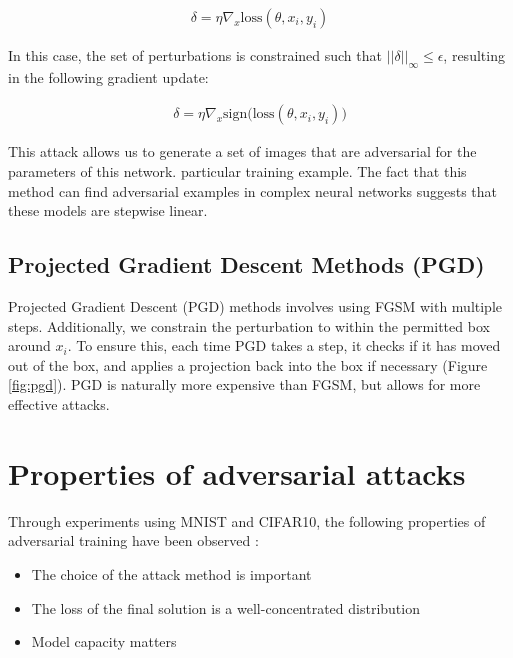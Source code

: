 \documentclass[10pt]{article}
\begin{document}
\begin{align*}
\delta = \eta \nabla_x \text{loss}(\theta, x_i, y_i)
\end{align*}

In this case, the set of perturbations is constrained such that $||\delta||_\infty\leq\epsilon$, resulting in the following gradient update:

\begin{align*}
\delta = \eta \nabla_x \text{sign}\Big(\text{loss}(\theta, x_i, y_i)\Big)
\end{align*}

This attack allows us to generate a set of images that are adversarial for the parameters of this network. particular training example. The fact that this method can find adversarial examples in complex neural networks suggests that these models are stepwise linear.

\subsection{Projected Gradient Descent Methods (PGD)}

Projected Gradient Descent (PGD) methods involves using FGSM with multiple steps. Additionally, we constrain the perturbation to within the permitted box around $x_i$. To ensure this, each time PGD takes a step, it checks if it has moved out of the box, and applies a projection back into the box if necessary (Figure \ref{fig:pgd}).
PGD is naturally more expensive than FGSM, but allows for more effective attacks.

\section{Properties of adversarial attacks}

Through experiments using MNIST and CIFAR10, the following properties of adversarial training have been observed \cite{Madry2017}:
\begin{itemize}
\item The choice of the attack method is important
\item The loss of the final solution is a well-concentrated distribution
\item Model capacity matters
\end{itemize}
\end{document}
